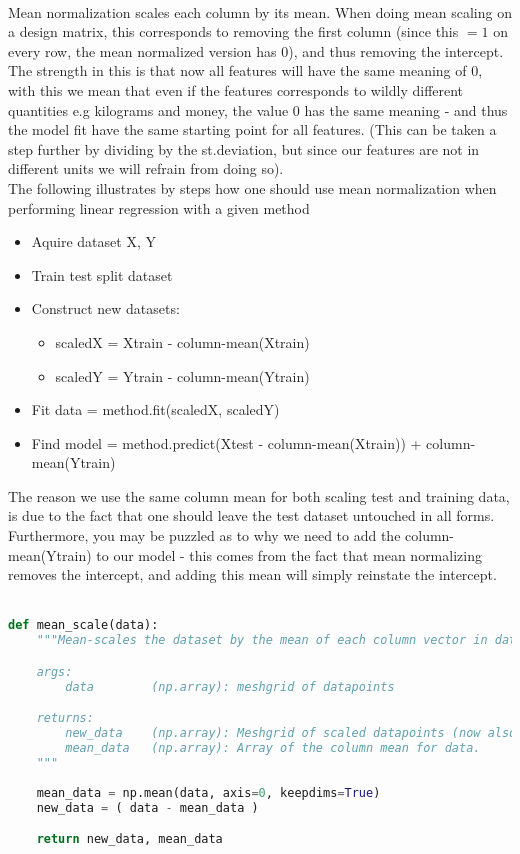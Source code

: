 \documentclass[../main.tex]{subfiles}
\begin{document}
\\\indent Mean normalization scales each column by its mean. When doing mean scaling on a design matrix, this corresponds to removing the first column (since this $=1$ on every row, the mean normalized version has 0), and thus removing the intercept. The strength in this is that now all features will have the same meaning of 0, with this we mean that even if the features corresponds to wildly different quantities e.g kilograms and money, the value 0 has the same meaning - and thus the model fit have the same starting point for all features. (This can be taken a step further by dividing by the st.deviation, but since our features are not in different units we will refrain from doing so). \\\indent
The following illustrates by steps how one should use mean normalization when performing linear regression with a given method
\begin{itemize}
    \item Aquire dataset X, Y
    \item Train test split dataset
    \item Construct new datasets: 
    \begin{itemize}
        \item scaledX = Xtrain - column-mean(Xtrain)
        \item scaledY = Ytrain - column-mean(Ytrain)
    \end{itemize}
    \item Fit data = method.fit(scaledX, scaledY)
    \item Find model = method.predict(Xtest - column-mean(Xtrain)) + column-mean(Ytrain)
\end{itemize}
The reason we use the same column mean for both scaling test and training data, is due to the fact that one should leave the test dataset untouched in all forms. \\\indent Furthermore, you may be puzzled as to why we need to add the column-mean(Ytrain) to our model - this comes from the fact that mean normalizing removes the intercept, and adding this mean will simply reinstate the intercept. \\\\\indent 


\begin{lstlisting}[language=Python]
def mean_scale(data):
    """Mean-scales the dataset by the mean of each column vector in data

    args:
        data        (np.array): meshgrid of datapoints

    returns:
        new_data    (np.array): Meshgrid of scaled datapoints (now also centered)
        mean_data   (np.array): Array of the column mean for data.
    """
    
    mean_data = np.mean(data, axis=0, keepdims=True)
    new_data = ( data - mean_data )

    return new_data, mean_data
\end{lstlisting}
\end{document}

